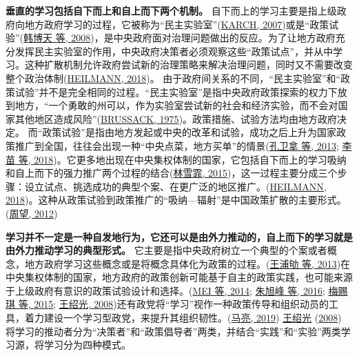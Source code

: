 \documentclass[
  12pt,
]{ctexart}
\begin{document}
\textbf{垂直的学习包括自下而上和自上而下两个机制。}
自下而上的学习主要是指上级政府向地方政府学习的过程，它被称为``民主实验室''(\protect\hyperlink{ref-Karch2007}{KARCH, 2007})或是``政策试验''(\protect\hyperlink{ref-HanBoTianShiLei2008}{韩博天 等, 2008})，是中央政府面对治理问题做出的反应。为了让地方政府充分发挥民主实验室的作用，中央政府决策者必须观察这些``政策试点''，并从中学习。这种扩散机制允许政府尝试新的治理策略来解决治理问题，同时又不需要改变整个政治体制(\protect\hyperlink{ref-Heilmann2018}{HEILMANN, 2018})。
由于政府间关系的不同，``民主实验室''和``政策试验''并不是完全相同的过程。``民主实验室''是指中央政府政策探索的权力下放到地方，``一个勇敢的州可以，作为实验室尝试新的社会和经济实验，而不会对国家其他地区造成风险''(\protect\hyperlink{ref-Brussack1975}{BRUSSACK, 1975})。政策措施、试验方法均由地方政府决定。
而``政策试验''是指由地方发起或中央的改革和试验，成功之后上升为国家政策推广到全国，往往会出现一种``中央点菜，地方买单''的情景(\protect\hyperlink{ref-KongWeiNaZhangGuang2013}{孔卫拿 等, 2013}; \protect\hyperlink{ref-LiMiaoCuiJun2018}{李苗 等, 2018})。它更多地出现在中央集权体制的国家，它包括自下而上的学习吸纳和自上而下的强力推广两个过程的结合(\protect\hyperlink{ref-LinXueFei2015}{林雪霏, 2015})，这一过程主要分成三个步骤：设立试点、挑选成功的典型个案、在更广泛的地区推广。(\protect\hyperlink{ref-Heilmann2018}{HEILMANN, 2018})。这种从政策试验到政策推广的``吸纳---辐射''是中国政策扩散的主要形式。(\protect\hyperlink{ref-ZhouWang2012}{周望, 2012})

\textbf{学习并不一定是一种自发地行为，它还可以是由外力推动的，自上而下的学习就是由外力推动学习的典型形式。}
它主要是指中央政府树立一个典型的个案或者概念，地方政府学习这些概念或是将概念具体化为政策的过程。(\protect\hyperlink{ref-WangPuQuLaiXianJin2013}{王浦劬 等, 2013})在中央集权体制的国家，地方政府的政策创新可能基于自主的政策实践，也可能来源于上级政府有意识的政策试验设计和选择。(\protect\hyperlink{ref-MeiLiu2014}{MEI 等, 2014}; \protect\hyperlink{ref-ZhuXuFengZhaoHui2016}{朱旭峰 等, 2016}; \protect\hyperlink{ref-MeiSiQiEtAl2015}{梅赐琪 等, 2015}; \protect\hyperlink{ref-WangShaoGuang2008a}{王绍光, 2008})还有政党将``学习''视作一种政策传导和组织动员的工具，着力建设一个学习型政党，来提升其组织韧性。(\protect\hyperlink{ref-MaLiang2019}{马亮, 2019})
\protect\hyperlink{ref-WangShaoGuang2008a}{王绍光} (\protect\hyperlink{ref-WangShaoGuang2008a}{2008}) 将学习的推动者分为``决策者''和``政策倡导者''两类，并结合``实践''和``实验''两类学习源，将学习分为四种模式。
\end{document}
